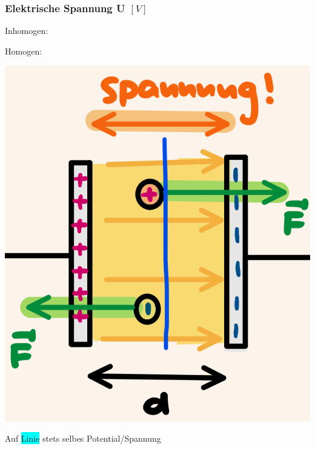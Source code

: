 \subsubsection{Elektrische Spannung U \hfill $[V]$}
        Inhomogen:
            
        Homogen:

        \vspace{-1mm}
            \begin{minipage}{0.41\linewidth}
                \begin{footnotesize}
                    \begin{center}
                        \vspace{2mm}
                        \includegraphics[width = 15 mm]{src/images/hom_potentialfeld.png}
                    \end{center}
                \end{footnotesize}
            \end{minipage}
            \begin{minipage}{0.58\linewidth}
                \begin{scriptsize}
                    \begin{center}
                        Auf \colorbox{Cyan}{Linie} stets selbes Potential/Spannung
                    \end{center}
                \end{scriptsize}
            \end{minipage}
            \vspace{1mm}
